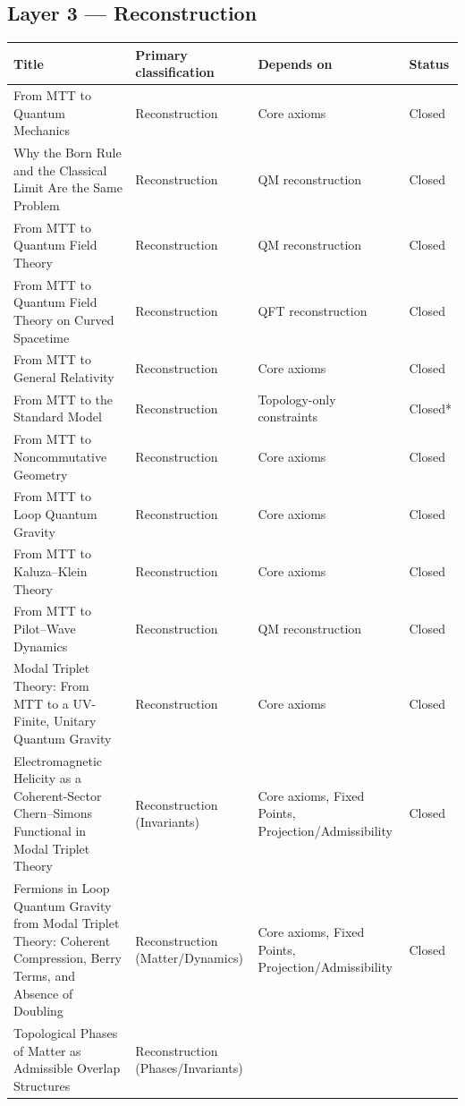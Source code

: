 \documentclass[11pt]{article}
\begin{document}
\subsection{Layer 3 --- Reconstruction}

\begin{center}
\small
\begin{tabular}{|p{7.2cm}|p{3.6cm}|p{3.6cm}|p{1.6cm}|}
\hline
\textbf{Title} & \textbf{Primary classification} & \textbf{Depends on} & \textbf{Status}\\
\hline
From MTT to Quantum Mechanics
& Reconstruction & Core axioms & Closed\\
\hline
Why the Born Rule and the Classical Limit Are the Same Problem
& Reconstruction & QM reconstruction & Closed\\
\hline
From MTT to Quantum Field Theory
& Reconstruction & QM reconstruction & Closed\\
\hline
From MTT to Quantum Field Theory on Curved Spacetime
& Reconstruction & QFT reconstruction & Closed\\
\hline
From MTT to General Relativity
& Reconstruction & Core axioms & Closed\\
\hline
From MTT to the Standard Model
& Reconstruction & Topology-only constraints & Closed*\\
\hline
From MTT to Noncommutative Geometry
& Reconstruction & Core axioms & Closed\\
\hline
From MTT to Loop Quantum Gravity
& Reconstruction & Core axioms & Closed\\
\hline
From MTT to Kaluza--Klein Theory
& Reconstruction & Core axioms & Closed\\
\hline
From MTT to Pilot--Wave Dynamics &
Reconstruction & QM reconstruction & Closed \\
\hline
Modal Triplet Theory: From MTT to a UV-Finite, Unitary Quantum Gravity
& Reconstruction
& Core axioms
& Closed
\\
\hline
Electromagnetic Helicity as a Coherent-Sector Chern--Simons Functional in Modal Triplet Theory
& Reconstruction (Invariants)
& Core axioms, Fixed Points, Projection/Admissibility
& Closed\\
\hline
Fermions in Loop Quantum Gravity from Modal Triplet Theory: Coherent Compression, Berry Terms, and Absence of Doubling
& Reconstruction (Matter/Dynamics)
& Core axioms, Fixed Points, Projection/Admissibility
& Closed\\
\hline
Topological Phases of Matter as Admissible Overlap Structures
& Reconstruction (Phases/Invariants)

\end{tabular}
\end{center}
\end{document}
